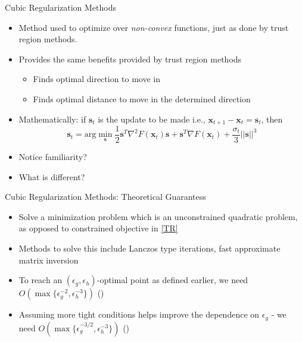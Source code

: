 \documentclass[10pt]{beamer}
\newcommand{\h}{\nabla^{2}}
\newcommand{\g}{\nabla}
\newcommand{\xbold}{\mathbf{x}}
\newcommand{\sbold}{\mathbf{s}}
\newcommand{\eg}{\epsilon_{g}}
\newcommand{\eh}{\epsilon_{h}}
\begin{document}
\begin{frame}{Cubic Regularization Methods}
\begin{itemize}
\item<1->{Method used to optimize over \emph{non-convex} functions, just as done by trust region methods.}
\item<2->{Provides the same benefits provided by trust region methods
  \begin{itemize}
    \item<3->Finds optimal direction to move in
    \item<4->Finds optimal distance to move in the determined direction
  \end{itemize}
  }
\item<5->{Mathematically: if \(\sbold_{t}\) is the update to be made i.e., \(\xbold_{t+1} - \xbold_{t} = \sbold_{t}\), then
\begin{equation}
\label{CR}
\sbold_{t} = \text{arg}\min_{\sbold} \frac{1}{2}\sbold^{T} \h F(\xbold_{t}) \sbold + \sbold^{T} \g F(\xbold_{t}) + \frac{\sigma_{t}}{3}||\sbold||^3
\end{equation}
}
\item<6->{Notice familiarity?}
\item<7->{What is different?}
\end{itemize}
\end{frame}

\begin{frame}{Cubic Regularization Methods: Theoretical Guarantess}
\begin{itemize}
\item<1->{Solve a minimization problem which is an unconstrained quadratic problem, as opposed to constrained objective in \ref{TR}}
\item<2->{Methods to solve this include Lanczos type iterations, fast approximate matrix inversion}
\item<3->{To reach an \((\eg, \eh)\)-optimal point as defined earlier, we need \(O\left(\max\{\eg^{-2}, \eh^{-3}\}\right)\) (\cite{cartis-joc})}
\item<4->{Assuming more tight conditions helps improve the dependence on \(\eg\) - we need \(O\left(\max\{\eg^{-3/2}, \eh^{-3}\}\right)\) (\cite{cartis-siam})}
\end{itemize}
\end{frame}
\end{document}
